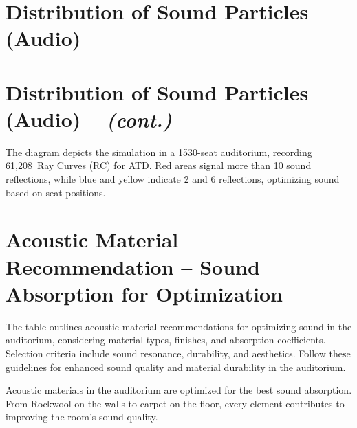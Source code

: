 \section*{%
  Distribution of Sound Particles (Audio)
 }

\columnbreak%
\section*{%
  Distribution of Sound Particles (Audio) -- \textit{(cont.)}
 }

The diagram depicts the simulation in a 1530-seat auditorium, recording 61,208~Ray Curves (RC) for ATD. Red areas signal more than 10 sound reflections, while blue and yellow indicate 2 and 6 reflections, optimizing sound based on seat positions.
\vfill
\section*{%
  Acoustic Material Recommendation -- Sound Absorption for Optimization
 }
\begin{minipage}[t]{0.55\linewidth}
	
	The table outlines acoustic material recommendations for optimizing sound in the auditorium, considering material types, finishes, and absorption coefficients. Selection criteria include sound resonance, durability, and aesthetics. Follow these guidelines for enhanced sound quality and material durability in the auditorium.
\end{minipage}
\hfill
\begin{minipage}[t]{0.425\linewidth}
	
	Acoustic materials in the auditorium are optimized for the best sound absorption. From Rockwool on the walls to carpet on the floor, every element contributes to improving the room's sound quality.
\end{minipage}
\EndTwoColumnLayout
\newpage
